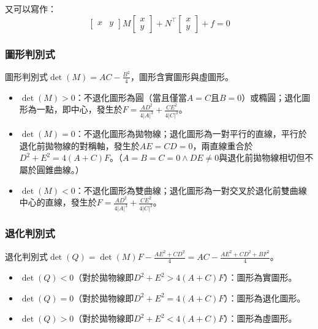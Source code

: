 \documentclass[a4paper,12pt]{report}
\begin{document}
又可以寫作：
\[\begin{bmatrix} x & y \end{bmatrix}
M\begin{bmatrix} x \\ y\end{bmatrix} + N^{\top}\begin{bmatrix} x \\ y\end{bmatrix} + f = 0\]
\subsubsection{圖形判別式}
圖形判別式$\det(M)=AC-\frac{B^2}{4}$，圖形含實圖形與虛圖形。
\begin{itemize}
\item $\det(M)>0$：不退化圖形為圓（當且僅當$A=C$且$B=0$）或橢圓；退化圖形為一點，即中心，發生於$F=\frac{AD^2}{4|A|^3}+\frac{CE^2}{4|C|^3}$。
\item $\det(M)=0$：不退化圖形為拋物線；退化圖形為一對平行的直線，平行於退化前拋物線的對稱軸，發生於$AE=CD=0$，兩直線重合於$D^2+E^2=4(A+C)F$。（$A=B=C=0\land DE\neq 0$與退化前拋物線相切但不屬於圓錐曲線。）
\item $\det(M)<0$：不退化圖形為雙曲線；退化圖形為一對交叉於退化前雙曲線中心的直線，發生於$F=\frac{AD^2}{4|A|^3}+\frac{CE^2}{4|C|^3}$。
\end{itemize}
\subsubsection{退化判別式}
退化判別式$\det(Q)=\det(M)F-\frac{AE^2+CD^2}{4}=AC-\frac{AE^2+CD^2+BF^2}{4}$。
\begin{itemize}
\item $\det(Q)<0$（對於拋物線即$D^2+E^2>4(A+C)F$）：圖形為實圖形。
\item $\det(Q)=0$（對於拋物線即$D^2+E^2=4(A+C)F$）：圖形為退化圖形。
\item $\det(Q)>0$（對於拋物線即$D^2+E^2<4(A+C)F$）：圖形為虛圖形。
\end{itemize}
\end{document}
